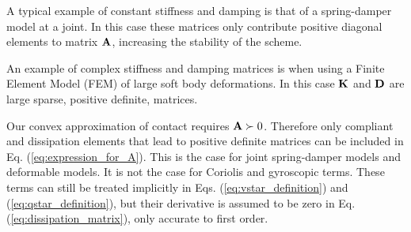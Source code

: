 A typical example of constant stiffness and damping is that of a spring-damper
model at a joint. In this case these matrices only contribute positive diagonal
elements to matrix ${\mathbf{A}}$, increasing the stability of the scheme.

An example of complex stiffness and damping matrices is when using a Finite
Element Model (FEM) of large soft body deformations. In this case ${\mathbf{K}}$ and
${\mathbf{D}}$ are large sparse, positive definite, matrices.

Our convex approximation of contact requires ${\mathbf{A}}\succ 0$. Therefore only
compliant and dissipation elements that lead to positive definite matrices can
be included in Eq. (\ref{eq:expression_for_A}). This is the case for joint
spring-damper models and deformable models. It is not the case for Coriolis and
gyroscopic terms. These terms can still be treated implicitly in Eqs.
(\ref{eq:vstar_definition}) and (\ref{eq:qstar_definition}), but their
derivative is assumed to be zero in Eq. (\ref{eq:dissipation_matrix}), only
accurate to first order.

